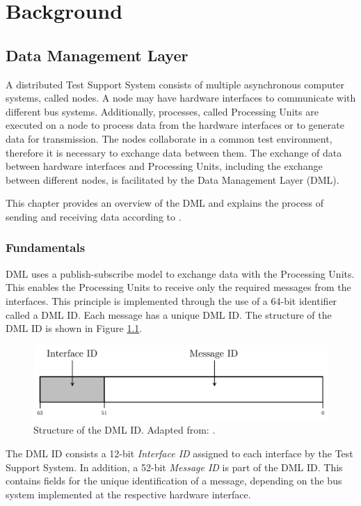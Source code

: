 \chapter{Background}

\section{Data Management Layer}
A distributed Test Support System consists of multiple asynchronous computer systems, called nodes. A node may have hardware interfaces to communicate with different bus systems. Additionally, processes, called Processing Units are executed on a node to process data from the hardware interfaces or to generate data for transmission. The nodes collaborate in a common test environment, therefore it is necessary to exchange data between them. The exchange of data between hardware interfaces and Processing Units, including the exchange between different nodes, is facilitated by the Data Management Layer (DML).

This chapter provides an overview of the DML and explains the process of sending and receiving data according to \cite{dml01}.

\subsection{Fundamentals}
DML uses a publish-subscribe model to exchange data with the Processing Units. This enables the Processing Units to receive only the required messages from the interfaces. This principle is implemented through the use of a 64-bit identifier called a DML ID. Each message has a unique DML ID.  The structure of the DML ID is shown in Figure \ref{fig:DmlId}.

\begin{figure}[h!]
    \centering
    \includegraphics[width=0.8\linewidth]{figures/dml/dml01.pdf}
    \caption[Structure of the DML ID]{Structure of the DML ID. Adapted from: \cite{dml01}.}
    \label{fig:DmlId}
\end{figure}

The DML ID consists a 12-bit \textit{Interface ID} assigned to each interface by the Test Support System. In addition, a 52-bit \textit{Message ID} is part of the DML ID. This contains fields for the unique identification of a message, depending on the bus system implemented at the respective hardware interface.

